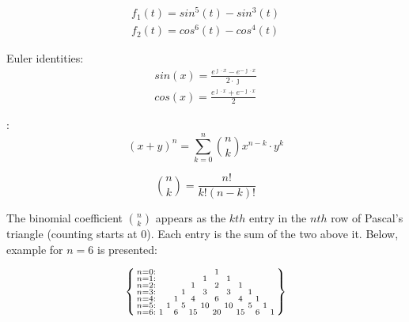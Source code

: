 \begin{task}

\begin{align*}
f_{1}(t)=sin^5(t)-sin^3(t) \\
f_{2}(t)=cos^6(t)-cos^4(t)
\end{align*}

Euler identities:
\begin{align*}
sin\left(x\right) = \frac{e^{\jmath \cdot x} - e^{-\jmath \cdot x}}{2 \cdot \jmath}\\
cos\left(x\right) = \frac{e^{\jmath \cdot x} + e^{-\jmath \cdot x}}{2}
\end{align*}

:
\begin{equation}
(x+y)^{n} = \sum_{k=0}^{n} \binom{n}{k} x^{n-k} \cdot y^{k}
\end{equation}

\begin{equation}
\binom{n}{k} = \frac{n!}{k!(n-k)!}
\end{equation}

The binomial coefficient $\binom{n}{k}$ appears as the $kth$ entry in the $nth$ row of Pascal's triangle (counting starts at 0). Each entry is the sum of the two above it. Below, example for $n=6$ is presented:

\begin{equation}
\begin{Bsmallmatrix}
    n=0:&   &   &   &   &   &   & 1 &   &   &   &   &  & \\
    n=1:&   &   &   &   &   & 1 &   & 1 &   &   &   &  & \\
    n=2:&   &   &   &   & 1 &   & 2 &   & 1 &   &   &  & \\
    n=3:&   &   &   & 1 &   & 3 &   & 3 &   & 1 &   &  & \\
    n=4:&   &   & 1 &   & 4 &   & 6 &   & 4 &   & 1 &  & \\
    n=5:&   & 1 &   & 5 &   &10 &   & 10&   & 5 &   & 1& \\
    n=6:& 1 &   & 6 &   & 15&   & 20&   & 15&   & 6 &  & 1
\end{Bsmallmatrix}
\end{equation}


\end{task}
